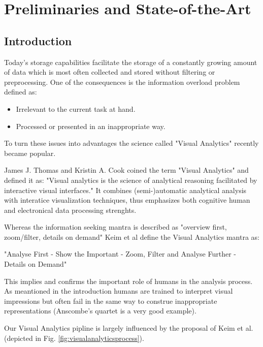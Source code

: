 \section{Preliminaries and State-of-the-Art}\label{sec::relwork} %

\subsection{Introduction}
Today's storage capabilities facilitate the storage of a constantly growing amount of data which is most often collected and stored without filtering or preprocessing.
One of the consequences is the information overload problem defined as:

\begin{itemize}
\item Irrelevant to the current task at hand.
\item Processed or presented in an inappropriate way.
\end{itemize}

To turn these issues into advantages the science called "Visual Analytics" recently became popular. 

James J. Thomas and Kristin A. Cook coined the term "Visual Analytics"\cite{VISUAL_ANALYTICS} and defined it as: "Visual analytics is the science of analytical reasoning facilitated by interactive visual interfaces." It combines (semi-)automatic analytical analysis with interatice visualization techniques, thus emphasizes both cognitive human and electronical data processing strenghts.

Whereas the information seeking mantra is described as "overview first, zoom/filter, details on demand" Keim et al define the Visual Analytics mantra as:

"Analyse First -
Show the Important -
Zoom, Filter and Analyse Further -
Details on Demand"\cite{keim2008visual}

This implies and confirms the important role of humans in the analysis process. As meantioned in the introduction humans are trained to interpret visual impressions but often fail in the same way to construe inappropriate representations (Anscombe's quartet is a very good example).

Our Visual Analytics pipline is largely influenced by the proposal of Keim et al. (depicted in Fig. \ref{fig:visualanalyticsprocess}).


